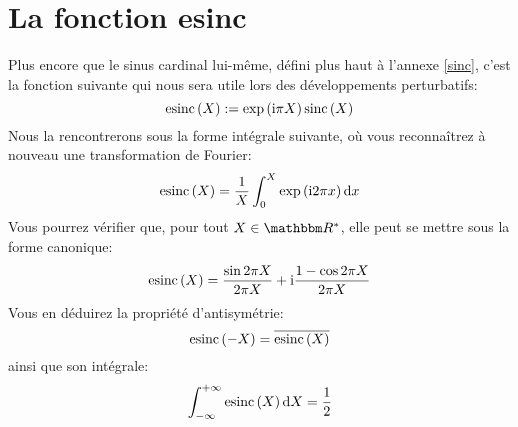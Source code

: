 \section{La fonction esinc}
\label{esinc}

Plus encore que le sinus cardinal lui-même, défini plus haut à l'annexe \ref{sinc},
c'est la fonction suivante qui nous sera utile lors des développements perturbatifs:
\begin{equation*}
\mathrm{esinc} \left( {X} \right) := \mathrm{exp} \left( {\mathrm{i} \pi X} \right) \mathrm{sinc} \left( {X} \right)
\end{equation*}
Nous la rencontrerons sous la forme intégrale suivante, où vous reconnaîtrez à nouveau une transformation de Fourier:
\begin{equation*}
\mathrm{esinc} \left( {X} \right) = \frac 1 X \int_0^X \mathrm{exp} \left( {\mathrm{i} 2 \pi x} \right) \mathrm dx
\end{equation*}
Vous pourrez vérifier que, pour tout $X \in \IR^*$, elle peut se mettre sous la forme canonique:
\begin{equation*}
\mathrm{esinc} \left( {X} \right) = \frac{\sin{2 \pi X}}{2 \pi X} + \mathrm{i} \frac{1 - \cos{2 \pi X}}{2 \pi X}
\end{equation*}
Vous en déduirez la propriété d'antisymétrie:
\begin{equation*}
\mathrm{esinc} \left( {-X} \right) = \overline{\mathrm{esinc} \left( {X} \right)}
\end{equation*}
ainsi que son intégrale:
\begin{equation*}
\int_{-\infty}^{+\infty} \mathrm{esinc} \left( {X} \right) \mathrm dX = \frac 1 2
\end{equation*}

